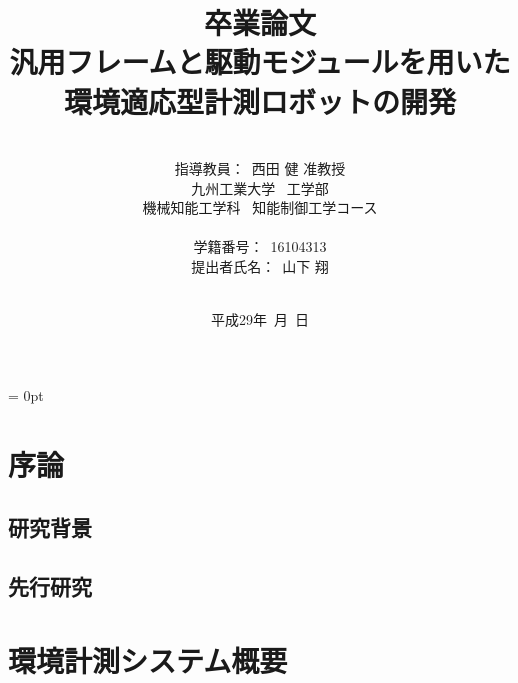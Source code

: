 \documentclass[a4paper,12pt]{ujarticle}
\title{卒業論文\\
汎用フレームと駆動モジュールを用いた\\環境適応型計測ロボットの開発\\
}
\author{\vspace{20mm}\\
指導教員：\ 西田 \hspace{0mm} 健 准教授\\
九州工業大学\ \hspace{0mm} 工学部\\
機械知能工学科\ \hspace{0mm} 知能制御工学コース \\
\vspace{0mm}\\
学籍番号：\ 16104313\\
提出者氏名：\ 山下 \hspace{0mm} 翔\\\vspace{5mm}\\ }
\date{平成29年\ 月\ 日}
\begin{document}
\titlepage
\maketitle
\thispagestyle{empty} \newpage
{}
\setcounter{page}{1}
\parindent = 0pt %

\begin{abstract}

\end{abstract}
\thispagestyle{empty}
\newpage
\thispagestyle{empty}
\tableofcontents
\newpage
\section{序論}
\subsection{研究背景}

\subsection{先行研究}

\section{環境計測システム概要}
\end{document}
